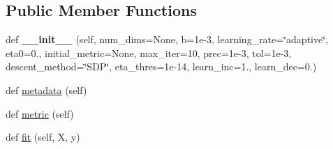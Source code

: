 \subsection*{Public Member Functions}
\begin{DoxyCompactItemize}
\item 
def {\bfseries \+\_\+\+\_\+init\+\_\+\+\_\+} (self, num\+\_\+dims=None, b=1e-\/3, learning\+\_\+rate=\char`\"{}adaptive\char`\"{}, eta0=0., initial\+\_\+metric=\+None, max\+\_\+iter=10, prec=1e-\/3, tol=1e-\/3, descent\+\_\+method=\char`\"{}\+S\+D\+P\char`\"{}, eta\+\_\+thres=1e-\/14, learn\+\_\+inc=1., learn\+\_\+dec=0.)\hypertarget{classdml_1_1ldml_1_1LDML_ab8de1c7e11f0341abf103e201fadc097}{}\label{classdml_1_1ldml_1_1LDML_ab8de1c7e11f0341abf103e201fadc097}

\item 
def \hyperlink{classdml_1_1ldml_1_1LDML_aff301dec555f6cba2967d55efa950385}{metadata} (self)
\item 
def \hyperlink{classdml_1_1ldml_1_1LDML_a4fdf9da7a2b97aefe931ac02867b56df}{metric} (self)
\item 
def \hyperlink{classdml_1_1ldml_1_1LDML_a8b6f427cf624e68ffda7d703189f7072}{fit} (self, X, y)
\end{DoxyCompactItemize}

